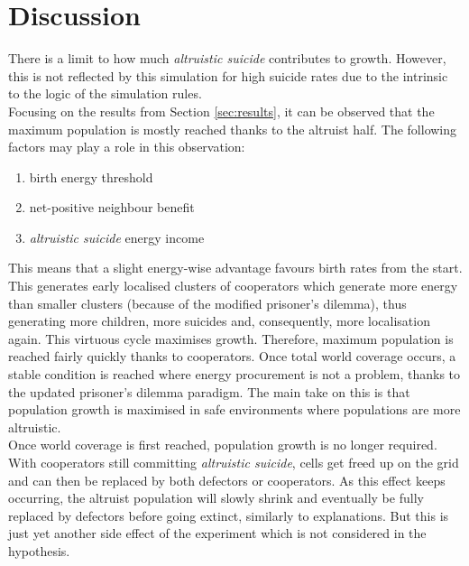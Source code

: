 \documentclass[a4paper,12pt,twocolumn]{article}
\begin{document}

\section{Discussion}

There is a limit to how much \textit{altruistic suicide} contributes to growth. However, this is not reflected by this simulation for high suicide rates due to the intrinsic to the logic of the simulation rules.\\

Focusing on the results from Section \ref{sec:results}, it can be observed that the maximum population is mostly reached thanks to the altruist half. The following factors may play a role in this observation:
\begin{enumerate}
    \item birth energy threshold
    \item net-positive neighbour benefit
    \item \textit{altruistic suicide} energy income
\end{enumerate}
This means that a slight energy-wise advantage favours birth rates from the start. This generates early localised clusters of cooperators which generate more energy than smaller clusters (because of the modified prisoner's dilemma), thus generating more children, more suicides and, consequently, more localisation again. This virtuous cycle maximises growth. Therefore, maximum population is reached fairly quickly thanks to cooperators. Once total world coverage occurs, a stable condition is reached where energy procurement is not a problem, thanks to the updated prisoner's dilemma paradigm. The main take on this is that population growth is maximised in safe environments where populations are more altruistic.\\

Once world coverage is first reached, population growth is no longer required. With cooperators still committing \textit{altruistic suicide}, cells get freed up on the grid and can then be replaced by both defectors or cooperators. As this effect keeps occurring, the altruist population will slowly shrink and eventually be fully replaced by defectors before going extinct, similarly to \citet{dawkins} explanations. But this is just yet another side effect of the experiment which is not considered in the hypothesis.
\end{document}
